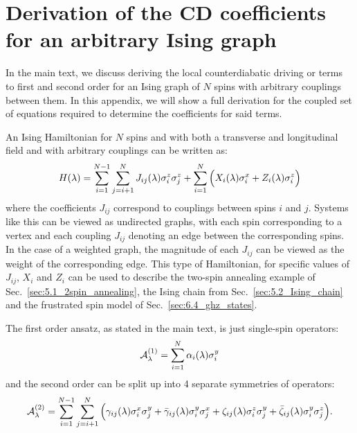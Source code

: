 \chapter{Derivation of the CD coefficients for an arbitrary Ising graph}\label{app:arbitrary_ising_derivation}

In the main text, we discuss deriving the local counterdiabatic driving or  terms to first and second order for an Ising graph of $N$ spins with arbitrary couplings between them. In this appendix, we will show a full derivation for the coupled set of equations required to determine the coefficients for said terms.

An Ising Hamiltonian for $N$ spins and with both a transverse and longitudinal field and with arbitrary couplings can be written as:
\begin{equation}\label{eq:ising_hamiltonian}
    H(\lambda) = \sum_{i = 1}^{N-1}\sum_{j = i+1}^{N} J_{ij}(\lambda) \sigma^z_i \sigma^z_j + \sum_{i = 1}^{N} \Big( X_i(\lambda) \sigma^x_i + Z_i(\lambda) \sigma^z_i \Big)
\end{equation}
where the coefficients $J_{ij}$ correspond to couplings between spins $i$ and $j$. Systems like this can be viewed as undirected graphs, with each spin corresponding to a vertex and each coupling $J_{ij}$ denoting an edge between the corresponding spins. In the case of a weighted graph, the magnitude of each $J_{ij}$ can be viewed as the weight of the corresponding edge. This type of Hamiltonian, for specific values of $J_{ij}$, $X_i$ and $Z_i$ can be used to describe the two-spin annealing example of Sec.~\ref{sec:5.1_2spin_annealing}, the Ising chain from Sec.~\ref{sec:5.2_Ising_chain} and the frustrated spin model of Sec.~\ref{sec:6.4_ghz_states}. 

The first order  ansatz, as stated in the main text, is just single-spin operators:
\begin{equation}\label{eq:spin_agp_1storder}
    \mathcal{A}_{\lambda}^{(1)} = \sum_{i = 1}^N \alpha_i(\lambda) \sigma^y_i
\end{equation}
and the second order can be split up into 4 separate symmetries of operators:
\begin{equation}\label{eq:spin_agp_2ndorder}
        \mathcal{A}_{\lambda}^{(2)} = \sum_{i = 1}^{N-1}\sum_{j = i+1}^{N} \Big( \gamma_{ij}(\lambda) \sigma^x_i \sigma^y_j + \Bar{\gamma}_{ij}(\lambda) \sigma^y_i \sigma^x_j + \zeta_{ij}(\lambda) \sigma^z_i \sigma^y_j + \Bar{\zeta}_{ij}(\lambda) \sigma^y_i \sigma^z_j \Big).
\end{equation}

